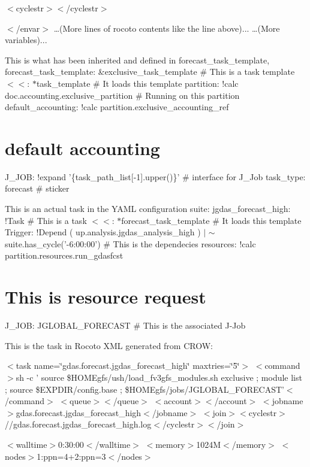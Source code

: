$<$cyclestr$>$$<$/cyclestr$>$

$<$/envar$>$ …(\-More lines of rocoto contents like the line above)... …(\-More variables)...

This is what has been inherited and defined in forecast\-\_\-task\-\_\-template, forecast\-\_\-task\-\_\-template\-: \&exclusive\-\_\-task\-\_\-template \# This is a task template $<$$<$\-: $\ast$task\-\_\-template \# It loads this template partition\-: !calc doc.\-accounting.\-exclusive\-\_\-partition \# Running on this partition default\-\_\-accounting\-: !calc partition.\-exclusive\-\_\-accounting\-\_\-ref \section*{default accounting}

J\-\_\-\-J\-O\-B\-: !expand '\{task\-\_\-path\-\_\-list\mbox{[}-\/1\mbox{]}.upper()\}' \# interface for J\-\_\-\-Job task\-\_\-type\-: forecast \# sticker

This is an actual task in the Y\-A\-M\-L configuration suite\-: jgdas\-\_\-forecast\-\_\-high\-: !\-Task \# This is a task $<$$<$\-: $\ast$forecast\-\_\-task\-\_\-template \# It loads this template Trigger\-: !\-Depend ( up.\-analysis.\-jgdas\-\_\-analysis\-\_\-high ) $|$ $\sim$ suite.\-has\-\_\-cycle('-\/6\-:00\-:00') \# This is the dependecies resources\-: !calc partition.\-resources.\-run\-\_\-gdasfcst \section*{This is resource request}

J\-\_\-\-J\-O\-B\-: J\-G\-L\-O\-B\-A\-L\-\_\-\-F\-O\-R\-E\-C\-A\-S\-T \# This is the associated J-\/\-Job

This is the task in Rocoto X\-M\-L generated from C\-R\-O\-W\-:

$<$task name=\char`\"{}gdas.\-forecast.\-jgdas\-\_\-forecast\-\_\-high\char`\"{} maxtries=\char`\"{}5\char`\"{}$>$ $<$command$>$sh -\/c ' source \$\-H\-O\-M\-Egfs/ush/load\-\_\-fv3gfs\-\_\-modules.sh exclusive ; module list ; source \$\-E\-X\-P\-D\-I\-R/config.base ; \$\-H\-O\-M\-Egfs/jobs/\-J\-G\-L\-O\-B\-A\-L\-\_\-\-F\-O\-R\-E\-C\-A\-S\-T'$<$/command$>$ $<$queue$>$$<$/queue$>$ $<$account$>$$<$/account$>$ $<$jobname$>$gdas.\-forecast.\-jgdas\-\_\-forecast\-\_\-high$<$/jobname$>$ $<$join$>$$<$cyclestr$>$//gdas.forecast.\-jgdas\-\_\-forecast\-\_\-high.\-log$<$/cyclestr$>$$<$/join$>$

$<$walltime$>$0\-:30\-:00$<$/walltime$>$ $<$memory$>$1024\-M$<$/memory$>$ $<$nodes$>$1\-:ppn=4+2\-:ppn=3$<$/nodes$>$


